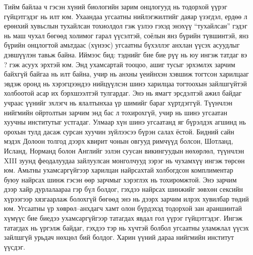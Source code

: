 Тийм байлаа ч гэсэн хүний биологийн зарим онцлогууд нь тодорхой үүрэг гүйцэтгэдэг нь илт юм. Ухаандаа угсаатны нийлэгжилтийг даяар үзэгдэл, ердөө л ерөнхий хувьслын тухайлсан тохиолдол гэж үзлээ гэхэд энэхүү “тухайлсан” гэдэг нь маш чухал бөгөөд холимог гарал үүсэлтэй, соёлын янз бүрийн түвшинтэй, янз бүрийн онцлогтой амьтдаас (хүнээс) угсаатны бүхэллэг анхлан үүсэх асуудлыг дэвшүүлэн тавьж байна. Иймээс бид: тэднийг бие бие рүү нь юу ингэж татдаг вэ ? гэж асуух эрхтэй юм. Энд ухамсартай тооцоо, ашиг тусыг эрхэмлэх зарчим байхгүй байгаа нь илт байна, учир нь анхны үеийнхэн хэвшиж тогтсон харилцааг эвдэж оронд нь хэрэгцээндээ нийцүүлсэн шинэ харилцаа тогтоохын зайлшгүйтэй холбоотой асар их бэрхшээлтэй тулгардаг. Энэ нь ямагт эрсдэлтэй ажил байдаг учраас үүнийг эхлэгч нь ялалтынхаа үр шимийг бараг хүртдэггүй. Түүнчлэн нийгмийн ойртолтын зарчим энд бас л тохирохгүй, учир нь шинэ угсаатан хуучны институтыг устгадаг. Улмаар хүн шинэ угсаатанд яг бүрэлдэх агшинд нь орохын тулд дасаж сурсан хуучин зүйлээсээ бүрэн салах ёстой. Бидний сайн мэдэх Долоон толгод дээрх квирит чонын овгууд римчүүд болсон, Шотланд, Исланд, Норманд болон Английг эзлэн суусан викингуудын нөхөрлөл, түүнчлэн XIII зуунд феодалуудаа зайлуулсан монголчууд зэрэг нь чухамхүү ингэж төрсөн юм. Амьтны ухамсаргүйгээр харилцан найрсахтай холбогдсон комплиментар буюу найрсах шинж гэсэн өөр зарчмыг хэрэглэх нь тохиромжтой. Энэ зарчим дээр хайр дурлалаараа гэр бүл болдог, гэхдээ найрсах шинжийг зөвхөн сексийн хүрээгээр хязгаарлаж болохгүй бөгөөд энэ нь дээрх зарчим илрэх хувилбар төдий юм. Угсаатны үр хөврөл–анхдагч хамт олон бүрдэхэд тодорхой зан араншинтай хүмүүс бие биедээ ухамсаргүйгээр татагдах явдал гол үүрэг гүйцэтгэдэг. Ингэж татагдах нь үргэлж байдаг, гэхдээ тэр нь хүчтэй болбол угсаатны уламжлал үүсэх зайлшгүй урьдач нөхцөл бий болдог. Харин үүний дараа нийгмийн институт үүсдэг.
